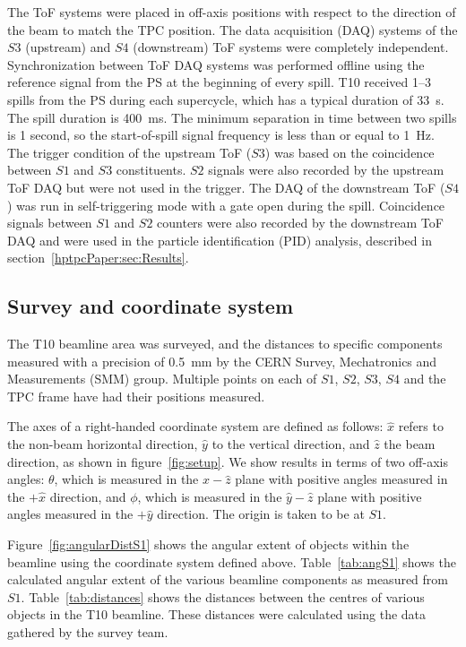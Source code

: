 The ToF systems were placed in off-axis positions with respect to the direction of the beam to match the TPC position.
The data acquisition (DAQ) systems of the $\mathit{S3}$ (upstream) and $\mathit{S4}$ (downstream) ToF systems were completely independent.
Synchronization between ToF DAQ systems was performed offline using the reference signal from the PS at the beginning of every spill.
T10 received 1--3 spills from the PS during each supercycle, which has a typical duration of 33~s.
The spill duration is 400~ms.
The minimum separation in time between two spills is 1 second, so the start-of-spill signal frequency is less than or equal to 1~Hz.
The trigger condition of the upstream ToF ($\mathit{S3}$) was based on the coincidence between $\mathit{S1}$ and $\mathit{S3}$ constituents.
$\mathit{S2}$ signals were also recorded by the upstream ToF DAQ but were not used in the trigger.
The DAQ of the downstream ToF ($\mathit{S4}$) was run in self-triggering mode with a gate open during the spill.
Coincidence signals between $\mathit{S1}$ and $\mathit{S2}$ counters were also recorded by the downstream ToF DAQ and were used in the particle identification (PID) analysis, described in section~\ref{hptpcPaper:sec:Results}.  

\subsection{Survey and coordinate system}
\label{sec:coord}
The T10 beamline area was surveyed, and the distances to specific components measured with a precision of 0.5~mm by the CERN Survey, Mechatronics and Measurements (SMM) group.
Multiple points on each of $\mathit{S1}$, $\mathit{S2}$, $\mathit{S3}$, $\mathit{S4}$ and the TPC frame have had their positions measured.

The axes of a right-handed coordinate system are defined as follows: $\hat{x}$ refers to the non-beam horizontal direction, $\hat{y}$ to the vertical direction, and $\hat{z}$ the beam direction, as shown in figure~\ref{fig:setup}.
We show results in terms of two off-axis angles: $\theta$, which is measured in the $\hat{x}-\hat{z}$ plane with positive angles measured in the $+\hat{x}$ direction, and $\phi$, which is measured in the $\hat{y}-\hat{z}$ plane with positive angles measured in the $+\hat{y}$ direction.
The origin is taken to be at $\mathit{S1}$.

Figure~\ref{fig:angularDistS1} shows the angular extent of objects within the beamline using the coordinate system defined above.
Table~\ref{tab:angS1} shows the calculated angular extent of the various beamline components as measured from $\mathit{S1}$.
Table~\ref{tab:distances} shows the distances between the centres of various objects in the T10 beamline.
These distances were calculated using the data gathered by the survey team.

